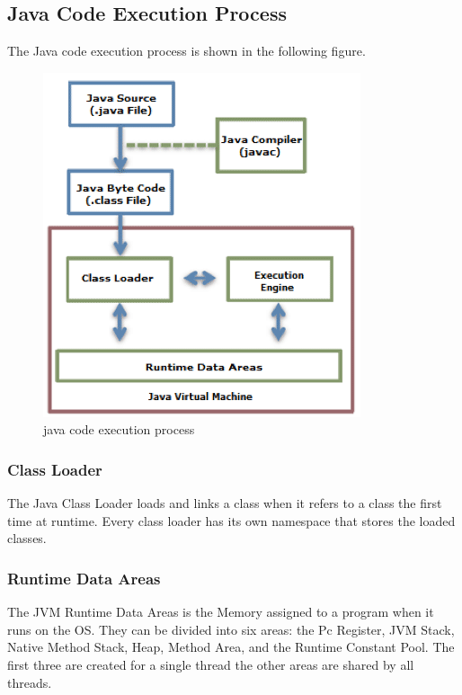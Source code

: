 \subsection{Java Code Execution Process} 
The Java code execution process is shown in the following figure. 
\begin{figure}[htbp]
\centering
\includegraphics[width=\textwidth,height=\textheight,keepaspectratio]{graphics/java-code-execution-process.png}
\caption{java code execution process \cite{javaJVM}}
\end{figure}
\subsubsection{Class Loader}
The Java Class Loader loads and links a class when it refers to a class the first time at runtime. Every class loader has its own namespace that stores the loaded classes.\cite{javaJVM} 

\subsubsection{Runtime Data Areas}
The JVM Runtime Data Areas is the Memory assigned to a program when it runs on the OS. They can be divided into six areas: the Pc Register, JVM Stack, Native Method Stack, Heap, Method Area, and the Runtime Constant Pool. The first three are created for a single thread the other areas are shared by all threads.  


